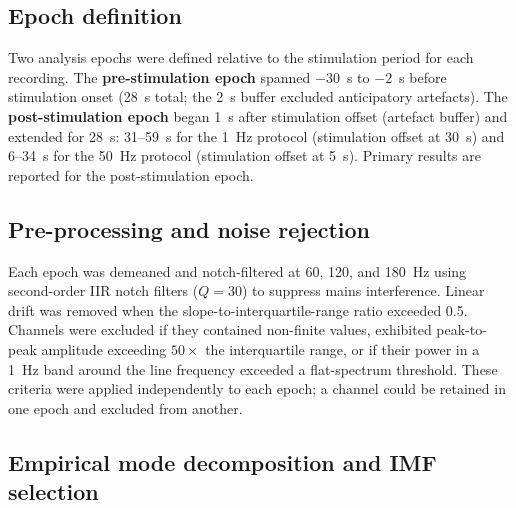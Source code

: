 \documentclass[11pt, a4paper]{article}
\begin{document}
\subsection{Epoch definition}

Two analysis epochs were defined relative to the stimulation period for
each recording. The \textbf{pre-stimulation epoch} spanned $-30$~s to
$-2$~s before stimulation onset (28~s total; the 2~s buffer excluded
anticipatory artefacts). The \textbf{post-stimulation epoch} began 1~s
after stimulation offset (artefact buffer) and extended for 28~s:
31--59~s for the 1~Hz protocol (stimulation offset at 30~s) and
6--34~s for the 50~Hz protocol (stimulation offset at 5~s). Primary
results are reported for the post-stimulation epoch.

\subsection{Pre-processing and noise rejection}

Each epoch was demeaned and notch-filtered at 60, 120, and 180~Hz using
second-order IIR notch filters ($Q = 30$) to suppress mains interference.
Linear drift was removed when the slope-to-interquartile-range ratio
exceeded 0.5. Channels were excluded if they contained non-finite values,
exhibited peak-to-peak amplitude exceeding $50 \times$ the
interquartile range, or if their power in a 1~Hz band around the line
frequency exceeded a flat-spectrum threshold. These criteria were applied
independently to each epoch; a channel could be retained in one epoch and
excluded from another.

\subsection{Empirical mode decomposition and IMF selection}
\end{document}
